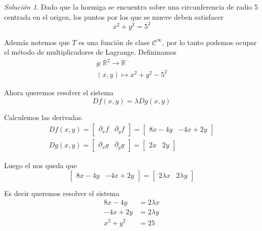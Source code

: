 \documentclass[a4paper,oneside,10.5pt]{article}
\newcommand\RR{\mathbb{R}}
\theoremstyle{definition}
\theoremstyle{plain}
\theoremstyle{remark}
\theoremstyle{theorem}
\newtheorem{sol}{Solución}
\begin{document}
\begin{sol}
    Dado que la hormiga se encuentra sobre una circunferencia de radio 5 centrada en el origen, los puntos por los que se mueve deben satisfacer
    \begin{equation*}
        x^2 + y^2 = 5^2
    \end{equation*}

    Además notemos que $T$ es una función de clase $\mathcal{C}^\infty$, por lo tanto podemos ocupar el método de multiplicadores de Lagrange. Defininamos
    \begin{gather*}
        g : \RR^2 \to \RR\\
        (x, y) \mapsto x^2 + y^2 - 5^2
    \end{gather*}

    Ahora queremos resolver el sistema
    \begin{equation*}
        Df(x, y) = \lambda Dg(x, y)
    \end{equation*}

    Calculemos las derivadas.
    \begin{gather*}
        Df(x, y) = \begin{bmatrix} \partial_x f & \partial_y f \end{bmatrix} = \begin{bmatrix}
            8x - 4y  & -4x + 2y
        \end{bmatrix}\\
        Dg(x, y) = \begin{bmatrix}
            \partial_x g & \partial_y g
        \end{bmatrix} = \begin{bmatrix}
            2x & 2y
        \end{bmatrix}
    \end{gather*}

    Luego el nos queda que
    \begin{equation*}
        \begin{bmatrix}
            8x - 4y  & -4x + 2y
        \end{bmatrix} = \begin{bmatrix}
            2\lambda x & 2 \lambda y
        \end{bmatrix}
    \end{equation*}

    Es decir queremos resolver el sistema
    \begin{align*}
        8x - 4y &= 2\lambda x\\
        -4x + 2y &= 2\lambda y\\
        x^2 + y^2 &= 25
    \end{align*}


\end{sol}
\end{document}
